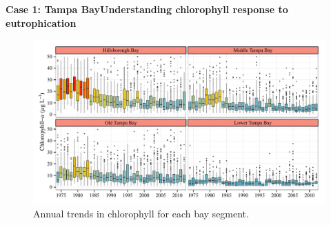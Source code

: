 \documentclass[serif]{beamer}\usepackage[]{graphicx}\usepackage[]{color}
\begin{document}
\begin{frame}{\textbf{Case 1: Tampa Bay}}{\textbf{Understanding chlorophyll response to eutrophication}}
\begin{figure}[!ht]


{\centering \includegraphics[width=\linewidth]{fig/annual_chl} 

}

\caption[Annual trends in chlorophyll for each bay segment]{Annual trends in chlorophyll for each bay segment.\label{fig:annual_chl}}
\end{figure}


\end{frame}

\end{document}
